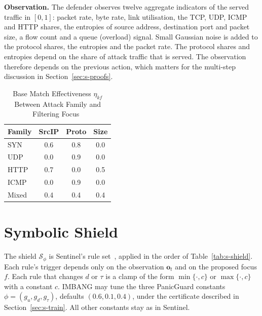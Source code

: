 \documentclass[10pt,journal,onecolumn]{IEEEtran}
\begin{document}
\textbf{Observation.} The defender observes twelve aggregate indicators of the served traffic in $[0,1]$: packet rate, byte rate, link utilisation, the TCP, UDP, ICMP and HTTP shares, the entropies of source address, destination port and packet size, a flow count and a queue (overload) signal. Small Gaussian noise is added to the protocol shares, the entropies and the packet rate. The protocol shares and entropies depend on the share of attack traffic that is served. The observation therefore depends on the previous action, which matters for the multi-step discussion in Section~\ref{sec:s-proofs}.

\begin{table}[!htbp]
\centering
\caption{Base Match Effectiveness $\eta_{kf}$ Between Attack Family and Filtering Focus~\cite{sentinelcode}}
\label{tab:s-match}
\small
\begin{tabular}{@{}lccc@{}}
\toprule
Family & SrcIP & Proto & Size \\
\midrule
SYN & 0.6 & 0.8 & 0.0 \\
UDP & 0.0 & 0.9 & 0.0 \\
HTTP & 0.7 & 0.0 & 0.5 \\
ICMP & 0.0 & 0.9 & 0.0 \\
Mixed & 0.4 & 0.4 & 0.4 \\
\bottomrule
\end{tabular}
\end{table}



\section{Symbolic Shield}
\label{sec:s-shield}
The shield $\mathcal{S}_\phi$ is Sentinel's rule set~\cite{alfatemi2026sentinel}, applied in the order of Table~\ref{tab:s-shield}. Each rule's trigger depends only on the observation $\mathbf{o}_t$ and on the proposed focus $f$. Each rule that changes $d$ or $\tau$ is a clamp of the form $\min\{\cdot,c\}$ or $\max\{\cdot,c\}$ with a constant $c$. IMBANG may tune the three PanicGuard constants $\phi=(g_u,g_d,g_\tau)$, defaults $(0.6,0.1,0.4)$, under the certificate described in Section~\ref{sec:s-train}. All other constants stay as in Sentinel.
\end{document}
